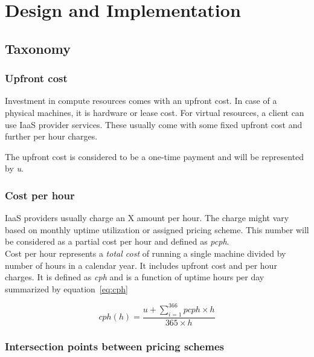 \documentclass[]{final_report}
\begin{document}

\chapter{Design and Implementation}

\section{Taxonomy}

\subsection{Upfront cost}

Investment in compute resources comes with an upfront cost. In case of a physical machines, it is hardware or lease cost. For virtual resources, a client can use IaaS provider services. These usually come with some fixed upfront cost and further per hour charges. \par

The upfront cost is considered to be a one-time payment and will be represented by \textit{u}.

\subsection{Cost per hour}

IaaS providers usually charge an X amount per hour. The charge might vary based on monthly uptime utilization or assigned pricing scheme. This number will be considered as a partial cost per hour and defined as \textit{pcph}. \\
Cost per hour represents a \textit{total cost} of running a single machine divided by number of hours in a calendar year. It includes upfront cost and per hour charges. It is defined as \textit{cph} and is a function of uptime hours per day summarized by equation~\ref{eq:cph}

\begin{equation}
\label{eq:cph}
cph(h) = \frac{u + \sum_{i=1}^{366} pcph \times h}{365 \times h}
\end{equation}

\subsection{Intersection points between pricing schemes}
\end{document}
